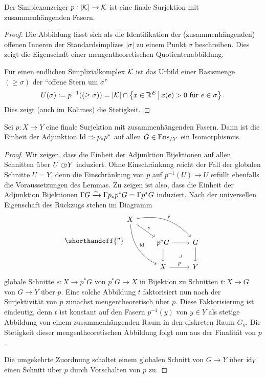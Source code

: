 \begin{lemma}
  Der Simplexanzeiger $p: |\mathcal{K}| \to \mathcal{K}$ ist eine finale Surjektion mit
  zusammenhängenden Fasern.
\end{lemma}
\begin{proof}
  Die Abbildung lässt sich als die Identifikation der
  (zusammenhängenden) offenen Inneren der Standardsimplizes $|\sigma|$
  zu einem Punkt $\sigma$ beschreiben. Dies zeigt die Eigenschaft
  einer mengentheoretischen Quotientenabbildung.

  Für einen endlichen Simplizialkomplex $\mathcal{K}$ ist das Urbild einer
  Basismenge $(\geq \sigma)$ der ``offene Stern um $\sigma$''
  \[ U(\sigma) := p^{-1}((\geq \sigma))
  = |\mathcal{K}| \cap \left\{ x \in \mathbb{R}^E \,\middle|\, x(e) > 0 \text{ für } e \in \sigma  \right\}.
  \]
  Dies zeigt (auch im Kolimes) die Stetigkeit.
\end{proof}
\begin{lemma}[\cite{TG}, 4.3.22] \label{final-pullback}
  Sei $p: X \to Y$ eine finale Surjektion mit zusammenhängenden
  Fasern. Dann ist die Einheit der Adjunktion $\operatorname{Id} \Rightarrow p_* p^*$ auf
  allen $G \in \operatorname{Ens}_{/Y}$ ein Isomorphismus.
\end{lemma}
\begin{proof}
  Wir zeigen, dass die Einheit der Adjunktion Bijektionen auf allen
  Schnitten über $U \subset\kern-0.58em\circ Y$ induziert. Ohne Einschränkung reicht der
  Fall der globalen Schnitte $U = Y$, denn die Einschränkung von $p$
  auf $p^{-1}(U) \to U$ erfüllt ebenfalls die Voraussetzungen des
  Lemmas. Zu zeigen ist also, dass die Einheit der Adjunktion
  Bijektionen $\Gamma G \xrightarrow[]{\sim} \Gamma p_* p^* G = \Gamma p^* G$
  induziert. Nach der universellen Eigenschaft des Rückzugs stehen im
  Diagramm
  \[
  \shorthandoff{"}
  \begin{tikzcd}
    X \arrow[ddr, bend right, "\id"]
    \arrow[drr, bend left,"t"] \arrow[dr, "s"] & & \\
    & p^* G \rar \dar \arrow[dr, phantom, "\lrcorner"]
    & G \dar \\
    & X \rar{p}
    & Y
  \end{tikzcd}
  \]
  globale Schnitte $s: X \to p^* G$ von $p^* G \to X$ in Bijektion zu
  Schnitten $t: X \to G$ von $G \to Y$ über $p$. Eine solche Abbildung
  $t$ faktorisiert nun nach der Surjektivität von $p$ zunächst
  mengentheoretisch über $p$. Diese Faktorisierung ist eindeutig, denn
  $t$ ist konstant auf den Fasern $p^{-1}(y)$ von $y \in Y$ als
  stetige Abbildung von einem zusammenhängenden Raum in den diskreten
  Raum $G_y$. Die Stetigkeit dieser mengentheoretischen Abbildung
  folgt nun aus der Finalität von $p$.

  Die umgekehrte Zuordnung schaltet einem globalen Schnitt von $G \to
  Y$ über $\operatorname{id}_Y$ einen Schnitt über $p$ durch Vorschalten von $p$ zu.
\end{proof}
